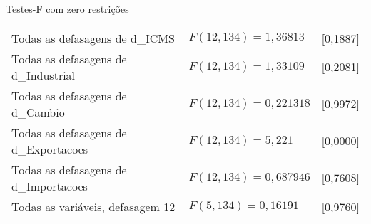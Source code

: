 \documentclass[11pt]{article}
\begin{document}
\begin{center}
Testes-F com zero restrições\\[1em]
\begin{tabular}{lll}
Todas as defasagens de d\_ICMS & $F(12, 134) = 1,36813$ & [0,1887]\\
Todas as defasagens de d\_Industrial & $F(12, 134) = 1,33109$ & [0,2081]\\
Todas as defasagens de d\_Cambio & $F(12, 134) = 0,221318$ & [0,9972]\\
Todas as defasagens de d\_Exportacoes & $F(12, 134) = 5,221$ & [0,0000]\\
Todas as defasagens de d\_Importacoes & $F(12, 134) = 0,687946$ & [0,7608]\\
Todas as variáveis, defasagem 12 & $F(5, 134) = 0,16191$ & [0,9760]\\
\end{tabular}
\end{center}

\clearpage
\end{document}
